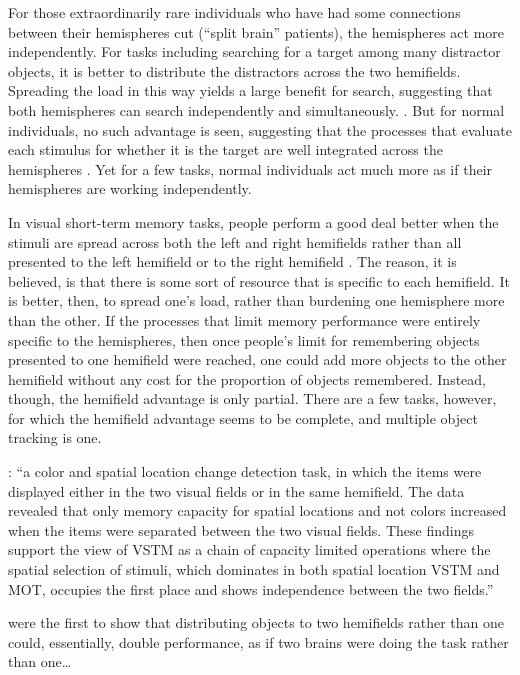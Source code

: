 \documentclass[]{book}
\begin{document}
For those extraordinarily rare individuals who have had some connections between their hemispheres cut (``split brain'' patients), the hemispheres act more independently. For tasks including searching for a target among many distractor objects, it is better to distribute the distractors across the two hemifields. Spreading the load in this way yields a large benefit for search, suggesting that both hemispheres can search independently and simultaneously. \citep{luckIndependentAttentionalScanning1994a}. But for normal individuals, no such advantage is seen, suggesting that the processes that evaluate each stimulus for whether it is the target are well integrated across the hemispheres \citep{luckIndependentHemisphericAttentional1989}. Yet for a few tasks, normal individuals act much more as if their hemispheres are working independently.

In visual short-term memory tasks, people perform a good deal better when the stimuli are spread across both the left and right hemifields rather than all presented to the left hemifield or to the right hemifield \citep{delvenneVisualShorttermMemory2012}. The reason, it is believed, is that there is some sort of resource that is specific to each hemifield. It is better, then, to spread one's load, rather than burdening one hemisphere more than the other. If the processes that limit memory performance were entirely specific to the hemispheres, then once people's limit for remembering objects presented to one hemifield were reached, one could add more objects to the other hemifield without any cost for the proportion of objects remembered. Instead, though, the hemifield advantage is only partial. There are a few tasks, however, for which the hemifield advantage seems to be complete, and multiple object tracking is one.

\citet{delvenneCapacityVisualShortterm2005}: ``a color and spatial location change detection task, in which the items were displayed either in the two visual fields or in the same hemifield. The data revealed that only memory capacity for spatial locations and not colors increased when the items were separated between the two visual fields. These findings support the view of VSTM as a chain of capacity limited operations where the spatial selection of stimuli, which dominates in both spatial location VSTM and MOT, occupies the first place and shows independence between the two fields.''

\citet{alvarezIndependentResourcesAttentional2005} were the first to show that distributing objects to two hemifields rather than one could, essentially, double performance, as if two brains were doing the task rather than one\ldots{}
\end{document}
